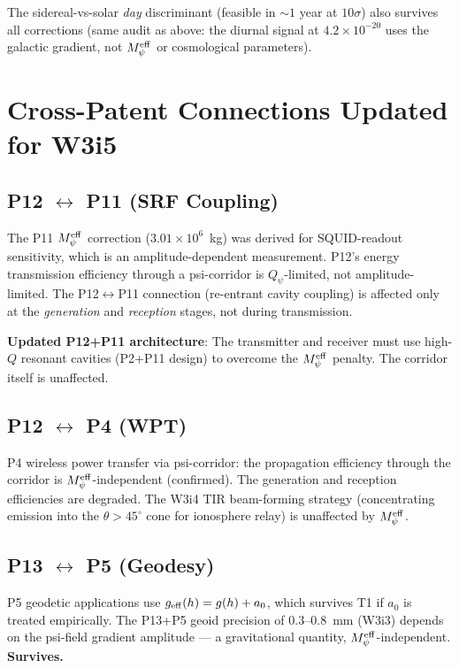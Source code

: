 \documentclass[aps,prd,twocolumn,superscriptaddress,nofootinbib]{revtex4-2}
\newcommand{\Qpsi}{Q_\psi}
\newcommand{\Meff}{M_\psi^{\rm eff}}
\newcommand{\ee}[1]{\times 10^{#1}}
\begin{document}
The sidereal-vs-solar \emph{day} discriminant (feasible in $\sim 1$ year
at $10\sigma$) also survives all corrections (same audit as above: the
diurnal signal at $4.2\ee{-20}$ uses the galactic gradient, not $\Meff$
or cosmological parameters).

\section{Cross-Patent Connections Updated for W3i5}
\label{sec:xref}

\subsection{P12 $\leftrightarrow$ P11 (SRF Coupling)}

The P11 $\Meff$ correction ($3.01\ee{6}$~kg) was derived for
SQUID-readout sensitivity, which is an amplitude-dependent measurement.
P12's energy transmission efficiency through a psi-corridor is
$\Qpsi$-limited, not amplitude-limited. The P12$\leftrightarrow$P11
connection (re-entrant cavity coupling) is affected only at the
\emph{generation} and \emph{reception} stages, not during transmission.

\textbf{Updated P12+P11 architecture}: The transmitter and receiver
must use high-$Q$ resonant cavities (P2+P11 design) to overcome the
$\Meff$ penalty. The corridor itself is unaffected.

\subsection{P12 $\leftrightarrow$ P4 (WPT)}

P4 wireless power transfer via psi-corridor: the propagation efficiency
through the corridor is $\Meff$-independent (confirmed). The generation
and reception efficiencies are degraded. The W3i4 TIR beam-forming
strategy (concentrating emission into the $\theta > 45^\circ$ cone
for ionosphere relay) is unaffected by $\Meff$.

\subsection{P13 $\leftrightarrow$ P5 (Geodesy)}

P5 geodetic applications use $g_{\rm eff}(h) = g(h) + a_0$, which
survives T1 if $a_0$ is treated empirically. The P13+P5 geoid precision
of $0.3$--$0.8$~mm (W3i3) depends on the psi-field gradient amplitude
--- a gravitational quantity, $\Meff$-independent. \textbf{Survives.}
\end{document}
